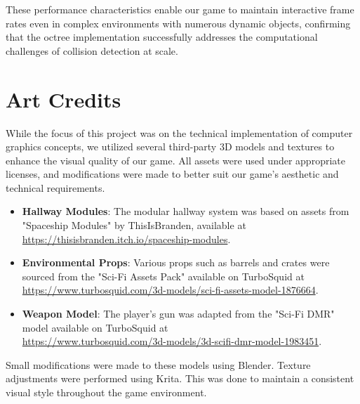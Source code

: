 \documentclass{article}
\begin{document}
These performance characteristics enable our game to maintain interactive frame
rates even in complex environments with numerous dynamic objects, confirming
that the octree implementation successfully addresses the computational
challenges of collision detection at scale.

\pagebreak
\section{Art Credits}
While the focus of this project was on the technical implementation of computer graphics concepts, we utilized several third-party 3D models and textures to enhance the visual quality of our game. All assets were used under appropriate licenses, and modifications were made to better suit our game's aesthetic and technical requirements.

\begin{itemize}
    \item \textbf{Hallway Modules}: The modular hallway system was based on assets from "Spaceship Modules" by ThisIsBranden, available at \url{https://thisisbranden.itch.io/spaceship-modules}.
    
    \item \textbf{Environmental Props}: Various props such as barrels and crates were sourced from the "Sci-Fi Assets Pack" available on TurboSquid at \url{https://www.turbosquid.com/3d-models/sci-fi-assets-model-1876664}.
    
    \item \textbf{Weapon Model}: The player's gun was adapted from the "Sci-Fi DMR" model available on TurboSquid at\\\url{https://www.turbosquid.com/3d-models/3d-scifi-dmr-model-1983451}.
\end{itemize}

Small modifications were made to these models using Blender. Texture adjustments were performed using Krita. This was done to maintain a consistent visual style throughout the game environment.

% 
% 
\end{document}
